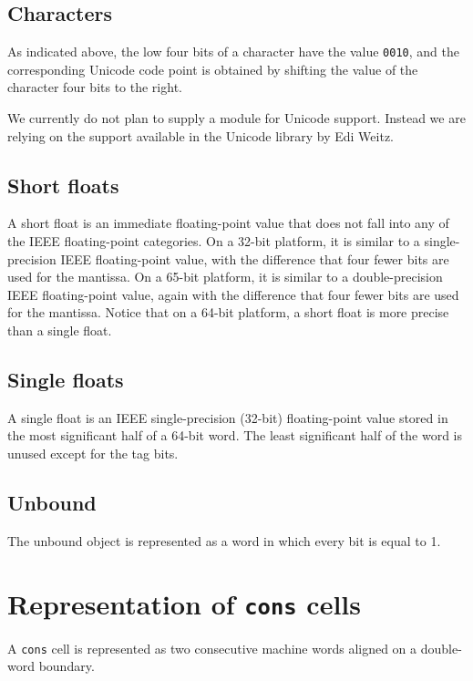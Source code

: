 \subsection{Characters}

As indicated above, the low four bits of a character have the value
\texttt{0010}, and the corresponding Unicode code point is obtained by
shifting the value of the character four bits to the right. 

We currently do not plan to supply a module for Unicode support.
Instead we are relying on the support available in the Unicode library
by Edi Weitz.

\subsection{Short floats}

A short float is an immediate floating-point value that does not fall
into any of the IEEE floating-point categories.  On a 32-bit platform,
it is similar to a single-precision IEEE floating-point value, with
the difference that four fewer bits are used for the mantissa.  On a
65-bit platform, it is similar to a double-precision IEEE
floating-point value, again with the difference that four fewer bits
are used for the mantissa.  Notice that on a 64-bit platform, a short
float is more precise than a single float. 

\subsection{Single floats}

A single float is an IEEE single-precision (32-bit) floating-point
value stored in the most significant half of a 64-bit word.  The least
significant half of the word is unused except for the tag bits. 

\subsection{Unbound}

The unbound object is represented as a word in which every bit is
equal to 1. 

\section{Representation of \texttt{cons} cells}

A \texttt{cons} cell is represented as two consecutive machine
words aligned on a double-word boundary.


